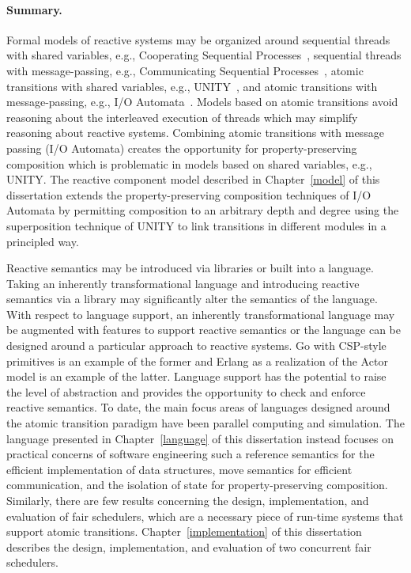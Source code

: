 \paragraph{Summary.}
Formal models of reactive systems may be organized around sequential threads with shared variables, e.g., Cooperating Sequential Processes~\cite{dijkstra1965cooperating}, sequential threads with message-passing, e.g., Communicating Sequential Processes~\cite{hoare1978communicating}, atomic transitions with shared variables, e.g., UNITY~\cite{chandy1989parallel}, and atomic transitions with message-passing, e.g., I/O Automata~\cite{nancy1996distributed}.
Models based on atomic transitions avoid reasoning about the interleaved execution of threads which may simplify reasoning about reactive systems.
Combining atomic transitions with message passing (I/O Automata) creates the opportunity for property-preserving composition which is problematic in models based on shared variables, e.g., UNITY.
The reactive component model described in Chapter~\ref{model} of this dissertation extends the property-preserving composition techniques of I/O Automata by permitting composition to an arbitrary depth and degree using the superposition technique of UNITY to link transitions in different modules in a principled way.

Reactive semantics may be introduced via libraries or built into a language.
Taking an inherently transformational language and introducing reactive semantics via a library may significantly alter the semantics of the language.
With respect to language support, an inherently transformational language may be augmented with features to support reactive semantics or the language can be designed around a particular approach to reactive systems.
Go with CSP-style primitives is an example of the former and Erlang as a realization of the Actor model is an example of the latter.
Language support has the potential to raise the level of abstraction and provides the opportunity to check and enforce reactive semantics.
To date, the main focus areas of languages designed around the atomic transition paradigm have been parallel computing and simulation.
The \rcgo{} language presented in Chapter~\ref{language} of this dissertation instead focuses on practical concerns of software engineering such a reference semantics for the efficient implementation of data structures, move semantics for efficient communication, and the isolation of state for property-preserving composition.
Similarly, there are few results concerning the design, implementation, and evaluation of fair schedulers, which are a necessary piece of run-time systems that support atomic transitions.
Chapter~\ref{implementation} of this dissertation describes the design, implementation, and evaluation of two concurrent fair schedulers.

